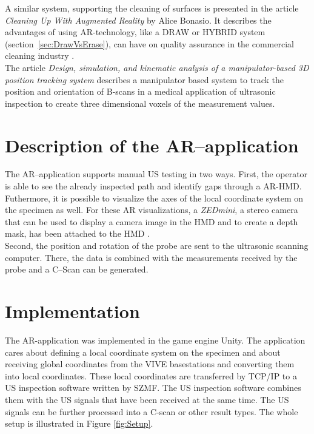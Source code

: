 \documentclass{VRARWorkshop}
\begin{document}
A similar system, supporting the cleaning of surfaces is presented in the article \textit{Cleaning Up With Augmented Reality} by Alice Bonasio.
It describes the advantages of using AR-technology, like a DRAW or HYBRID system (section~\ref{sec:DrawVsErase}), can have on quality assurance in the commercial cleaning industry \cite{ARClean}.\\

The article \textit{Design, simulation, and kinematic analysis of a manipulator-based 3D position tracking system} describes a manipulator based system to track the position and orientation of B-scans in a medical application of ultrasonic inspection to create three dimensional voxels of the measurement values.
\cite{fadzil_design_2015}\\


\section{Description of the AR--application}
The AR--application supports manual US testing in two ways. First,
the operator is able to see the already inspected path and identify gaps through a AR-{\sc HMD}.
Futhermore, it is possible to visualize the axes of the local coordinate system on the specimen as well.
For these AR visualizations, a \textit{ZEDmini}, a stereo camera that can be used to display a camera image in the {\sc HMD} and to create a depth mask, has been attached to the {\sc HMD} \cite{dorner_virtual_2013}. \\
Second, the position and rotation of the probe are sent to the ultrasonic scanning computer.
There, the data is combined with the measurements received by the probe and a C--Scan can be
generated.

\section{Implementation}
The AR-application was implemented in the game engine Unity. The application cares about defining a local coordinate
system on the specimen and about receiving
global coordinates from the VIVE basestations
and converting them into local coordinates.
These local coordinates are transferred by TCP/IP to a US inspection software written by SZMF.
The US inspection software combines them with the US signals that have been received
at the same time. The US signals can be further processed into a C-scan or other result types.
The whole setup is illustrated in Figure \ref{fig:Setup}. \\
\end{document}
